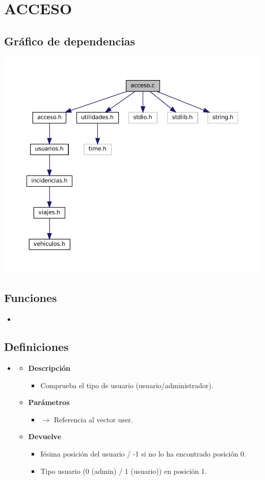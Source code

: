 \section{ACCESO}
\subsection{Gráfico de dependencias}
\includegraphics[width=\textwidth, angle=0]{dep/acceso_include.pdf}
\subsection{Funciones}
\begin{itemize}
    \item {}
\end{itemize}
\subsection{Definiciones}
\begin{itemize}
    \item {}
    \begin{itemize}
        \item \textbf{Descripción}
        \begin{itemize}
			\item Comprueba el tipo de usuario (usuario/administrador).
		\end{itemize}
		\item \textbf{Parámetros}
		\begin{itemize}
			\item {} $\rightarrow$ Referencia al vector user.
		\end{itemize}
		\item \textbf{Devuelve}
		\begin{itemize}
			\item Iésima posición del usuario / -1 si no lo ha encontrado posición 0.
			\item Tipo usuario (0 (admin) / 1 (usuario)) en posición 1.
		\end{itemize}
	\end{itemize}
\end{itemize}
\newpage
